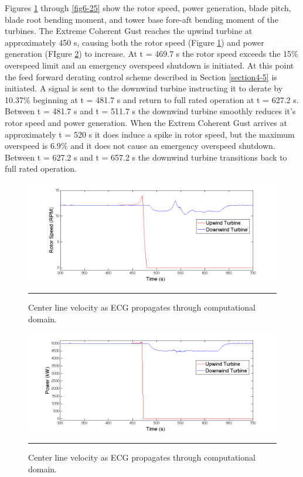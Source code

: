 Figures \ref{fig6-21} through \ref{fig6-25} show the rotor speed, power generation, blade pitch, blade root bending moment, and tower base fore-aft bending moment of the turbines. The Extreme Coherent Gust reaches the upwind turbine at approximately 450 s, causing both the rotor speed (Figure \ref{fig6-21}) and power generation (FIgure \ref{fig6-22}) to increase. At t = 469.7 s the rotor speed exceeds the 15\% overspeed limit and an emergency overspeed shutdown is initiated. At this point the feed forward derating control scheme described in Section \ref{section4-5} is initiated. A signal is sent to the downwind turbine instructing it to derate by 10.37\% beginning at t = 481.7 s and return to full rated operation at t = 627.2 s. Between t = 481.7 s and t = 511.7 s the downwind turbine smoothly reduces it's rotor speed and power generation. When the Extrem Coherent Gust arrives at approximately t = 520 s it does induce a spike in rotor speed, but the maximum overspeed is 6.9\% and it does not cause an emergency overspeed shutdown. Between t = 627.2 s and t = 657.2 s the downwind turbine transitions back to full rated operation.

\begin{figure}[htbp] \label{fig6-21}
	\centering
		\includegraphics[trim = {1cm 0 2cm 0}, clip, width = \linewidth]{Figures/ch6Figures/fig6-21.png}
		\rule{35em}{0.5pt}
	\caption{Center line velocity as ECG propagates through computational domain.}
\end{figure}
\begin{figure}[htbp] \label{fig6-22}
	\centering
		\includegraphics[trim = {1cm 0 2cm 0}, clip, width = \linewidth]{Figures/ch6Figures/fig6-22.png}
		\rule{35em}{0.5pt}
	\caption{Center line velocity as ECG propagates through computational domain.}
\end{figure}

